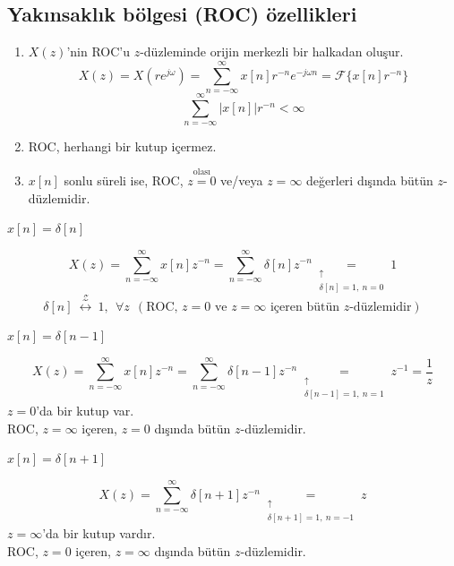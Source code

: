 \documentclass[11pt,a4paper]{article}
\begin{document}
\subsection{Yakınsaklık bölgesi (ROC) özellikleri}
\begin{enumerate}[label=\arabic*)]
  \item $X(z)$'nin ROC'u $z$-düzleminde orijin merkezli bir halkadan oluşur.
    \[ X(z)=X(re^{j\omega})=\sum_{n=-\infty}^{\infty}x[n]r^{-n}e^{-j\omega n}=\mathcal{F}\{x[n]r^{-n}\} \]
    \[ \sum_{n=-\infty}^{\infty}|x[n]|r^{-n}<\infty \]
  \item ROC, herhangi bir kutup içermez.
  \item $x[n]$ sonlu süreli ise, ROC, $\overset{\text{olası}}{z=0}$ ve/veya $z=\infty$ değerleri dışında bütün $z$-düzlemidir.
\end{enumerate}

\begin{ornek}[]
  $x[n]=\delta[n]$
\end{ornek}
\[
  X(z)=\sum_{n=-\infty}^{\infty}x[n]z^{-n}=\sum_{n=-\infty}^{\infty}\delta[n]z^{-n}\underset{\substack{\uparrow\\ \delta[n]=1,\ n=0}}{=}1
\]
\[
  \delta[n]\ \overset{\mathcal{Z}}{\longleftrightarrow}\ 1,\ \ \forall z\ \ (\text{ROC, } z=0 \text{ ve } z=\infty \text{ içeren bütün } z\text{-düzlemidir})
\]

\begin{ornek}[]
  $x[n]=\delta[n-1]$
\end{ornek}
\[
  X(z)=\sum_{n=-\infty}^{\infty}x[n]z^{-n}=\sum_{n=-\infty}^{\infty}\delta[n-1]z^{-n}\underset{\substack{\uparrow\\ \delta[n-1]=1,\ n=1}}{=}z^{-1}=\frac1z
\]
$z=0$'da bir kutup var.\\
ROC, $z=\infty$ içeren, $z=0$ dışında bütün $z$-düzlemidir.

\begin{ornek}[]
  $x[n]=\delta[n+1]$
\end{ornek}
\[
  X(z)=\sum_{n=-\infty}^{\infty}\delta[n+1]z^{-n}\underset{\substack{\uparrow\\ \delta[n+1]=1,\ n=-1}}{=}z
\]
$z=\infty$'da bir kutup vardır.\\
ROC, $z=0$ içeren, $z=\infty$ dışında bütün $z$-düzlemidir.
\end{document}
